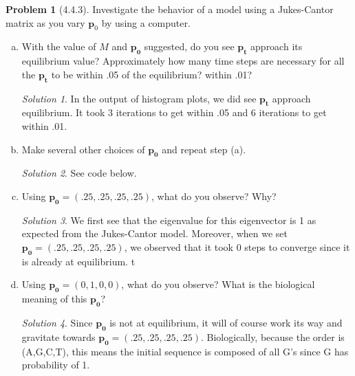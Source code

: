 \documentclass[11pt]{article}
\theoremstyle{definition}\newtheorem*{problem}{Problem}
\theoremstyle{remark}\newtheorem{claim}{Claim}
\theoremstyle{remark}\newtheorem*{sol}{Solution}
\begin{document}
\begin{problem}[4.4.3] 
Investigate the behavior of a model using a Jukes-Cantor matrix as you vary $\mathbf p_0$ by using a computer.\end{problem}
\begin{enumerate}[a.]
\item With the value of $M$ and $\mathbf {p_0}$ suggested, do you see $\mathbf {p_t}$ approach its equilibrium value? Approximately how many time steps are necessary for all the $\mathbf {p_t}$ to be within .05 of the equilibrium? within .01?
\begin{sol} In the output of histogram plots, we did see $\mathbf {p_t}$ approach equilibrium. It took 3 iterations to get within .05 and 6 iterations to get within .01.

\end{sol}

\item Make several other choices of $\mathbf {p_0}$ and repeat step (a). 
\begin{sol} See code below.

\end{sol}

\item Using $\mathbf {p_0}= (.25,.25,.25,.25)$, what do you observe? Why?
\begin{sol}
We first see that the eigenvalue for this eigenvector is 1 as expected from the Jukes-Cantor model. Moreover, when we set $\mathbf {p_0}= (.25,.25,.25,.25)$, we observed that it took 0 steps to converge since it is already at equilibrium. t

\end{sol}

\item Using $\mathbf {p_0}= (0,1,0,0)$, what do you observe? What is the biological meaning of this $\mathbf {p_0}$?
\begin{sol}
Since $\mathbf {p_0}$ is not at equilibrium, it will of course work its way and gravitate towards $\mathbf {p_0}= (.25,.25,.25,.25)$. Biologically, because the order is (A,G,C,T), this means the initial sequence is composed of all G's since G has probability of 1.
\end{sol}
\end{enumerate}
\end{document}
